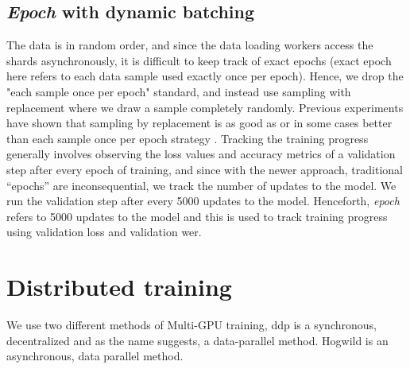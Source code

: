 \subsection{\emph{Epoch} with dynamic batching}
The data is in random order, and since the data loading workers access the shards asynchronously, it is difficult to keep track of exact epochs (exact epoch here refers to each data sample used exactly once per epoch). Hence, we drop the "each sample once per epoch" standard, and instead use sampling with replacement where we draw a sample completely randomly. Previous experiments have shown that sampling by replacement is as good as or in some cases better than each sample once per epoch strategy \cite{Recht2012BeneathConsequences, Nielsen2015NeuralLearning}. Tracking the training progress generally involves observing the loss values and accuracy metrics of a validation step after every epoch of training, and since with the newer approach, traditional ``epochs'' are inconsequential, we track the number of updates to the model. We run the validation step after every 5000 updates to the model. Henceforth, \emph{epoch} refers to 5000 updates to the model and this is used to track training progress using validation loss and validation \acrshort{wer}.

\section{Distributed training}
\label{section:di}
We use two different methods of Multi-GPU training, \acrfull{ddp} is a synchronous, decentralized and as the name suggests, a data-parallel method. Hogwild is an asynchronous, data parallel method. 

